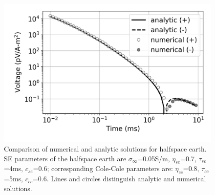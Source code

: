 \documentclass[manuscript]{geophysics}
\newcommand{\siginf}{\sigma_\infty}
\begin{document}
\begin{figure}[htb]
  \centering
  \includegraphics[width=1.0\textwidth]{figures/analytic_test.png}
  \caption{Comparison of numerical and analytic solutions for halfspace earth. SE parameters of the halfspace earth are $\siginf$=0.05S/m, $\eta_{se}$=0.7, $\tau_{se}$=4ms, $c_{se}$=0.6; corresponding Cole-Cole parameters are: $\eta_{cc}$=0.8, $\tau_{cc}$=5ms, $c_{cc}$=0.6. Lines and circles distinguish analytic and numerical solutions.}
  \label{fig:analytic_test}
\end{figure}
\clearpage

\end{document}
